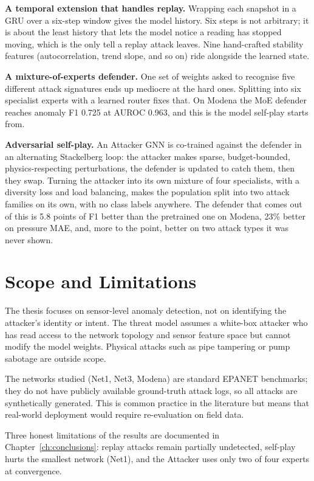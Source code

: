 \textbf{A temporal extension that handles replay.} Wrapping each
snapshot in a GRU over a six-step window gives the model history.
Six steps is not arbitrary; it is about the least history that lets
the model notice a reading has stopped moving, which is the only
tell a replay attack leaves. Nine hand-crafted stability features
(autocorrelation, trend slope, and so on) ride alongside the
learned \gru{} state.

\textbf{A mixture-of-experts defender.} One set of weights asked to
recognise five different attack signatures ends up mediocre at the
hard ones. Splitting into six specialist experts with a learned
router fixes that. On Modena the MoE defender reaches anomaly F1
0.725 at AUROC 0.963, and this is the model self-play starts from.

\textbf{Adversarial self-play.} An Attacker GNN is co-trained
against the defender in an alternating Stackelberg loop: the
attacker makes sparse, budget-bounded, physics-respecting
perturbations, the defender is updated to catch them, then they
swap. Turning the attacker into its own mixture of four specialists,
with a diversity loss and load balancing, makes the population split
into two attack families on its own, with no class labels anywhere.
The defender that comes out of this is 5.8 points of F1 better than
the pretrained one on Modena, 23\% better on pressure MAE, and,
more to the point, better on two attack types it was never shown.

\section{Scope and Limitations}
\label{sec:scope}

The thesis focuses on sensor-level anomaly detection, not on
identifying the attacker's identity or intent. The threat model
assumes a white-box attacker who has read access to the network
topology and sensor feature space but cannot modify the model
weights. Physical attacks such as pipe tampering or pump sabotage
are outside scope.

The networks studied (Net1, Net3, Modena) are standard EPANET
benchmarks; they do not have publicly available ground-truth attack
logs, so all attacks are synthetically generated. This is common
practice in the literature but means that real-world deployment
would require re-evaluation on field data.

Three honest limitations of the results are documented in
Chapter~\ref{ch:conclusions}: replay attacks remain partially
undetected, self-play hurts the smallest network (Net1), and the
Attacker \moe{} uses only two of four experts at convergence.

